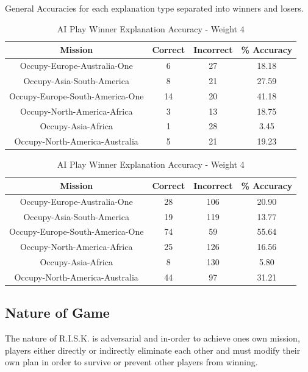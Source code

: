 \documentclass[parskip]{cs4rep}
\begin{document}
General Accuracies for each explanation type separated into winners and losers.

\begin{table}[ht]
\centering
\begin{tabular}{|c|c|c|c|}
\hline 
\textbf{Mission} & \textbf{Correct} & \textbf{Incorrect} & \textbf{\% Accuracy} \\ 
\hline 
Occupy-Europe-Australia-One & 6 & 27 & 18.18 \\  
\hline 
Occupy-Asia-South-America & 8 & 21 & 27.59 \\ 
\hline
Occupy-Europe-South-America-One & 14 & 20 & 41.18 \\
\hline
Occupy-North-America-Africa & 3 & 13 & 18.75 \\
\hline
Occupy-Asia-Africa & 1 & 28 & 3.45 \\
\hline
Occupy-North-America-Australia & 5 & 21 & 19.23 \\
\hline
\end{tabular}
\caption{AI Play Winner Explanation Accuracy - Weight 4}
\label{table:ai-4-winner-accuracy}
\end{table}

\begin{table}[ht]
\centering
\begin{tabular}{|c|c|c|c|}
\hline 
\textbf{Mission} & \textbf{Correct} & \textbf{Incorrect} & \textbf{\% Accuracy} \\ 
\hline 
Occupy-Europe-Australia-One & 28 & 106 & 20.90 \\  
\hline 
Occupy-Asia-South-America & 19 & 119 & 13.77 \\ 
\hline
Occupy-Europe-South-America-One & 74 & 59 & 55.64 \\
\hline
Occupy-North-America-Africa & 25 & 126 & 16.56 \\
\hline
Occupy-Asia-Africa & 8 & 130 & 5.80 \\
\hline
Occupy-North-America-Australia & 44 & 97 & 31.21 \\
\hline
\end{tabular}
\caption{AI Play Winner Explanation Accuracy - Weight 4}
\label{table:ai-4-loser-accuracy}
\end{table}

\subsection{Nature of Game}

The nature of R.I.S.K. is adversarial and in-order to achieve ones own mission, players either directly or indirectly eliminate each other and must modify their own plan in order to survive or prevent other players from winning. 
\end{document}
